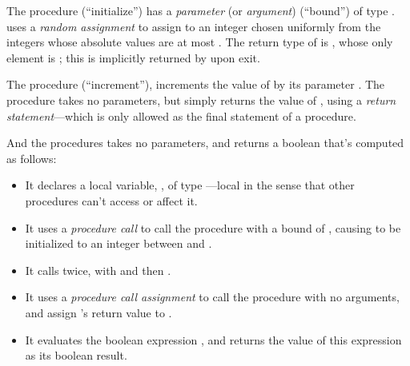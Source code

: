 The procedure  (``initialize'') has a \emph{parameter} (or
\emph{argument})  (``bound'') of type .  
uses a \emph{random assignment} to assign to  an integer chosen
uniformly from the integers whose absolute values are at most
.  The return type of  is , whose only
element is ; this is implicitly returned by  upon
exit.

The procedure  (``increment''), increments the value of
 by its parameter . The procedure  takes no
parameters, but simply returns the value of , using
a \emph{return statement}---which is only allowed as the
final statement of a procedure.

And the  procedures takes no parameters, and returns a boolean
that's computed as follows:
\begin{itemize}
\item It declares a local variable, , of type ---local
  in the sense that other procedures can't access or affect it.

\item It uses a \emph{procedure call} to call the procedure 
  with a bound of , causing  to be initialized to an
  integer between  and .

\item It calls  twice, with  and then .

\item It uses a \emph{procedure call assignment} to call the procedure
   with no arguments, and assign 's return value to .

\item It evaluates the boolean expression , and returns
  the value of this expression as its boolean result.
\end{itemize}

